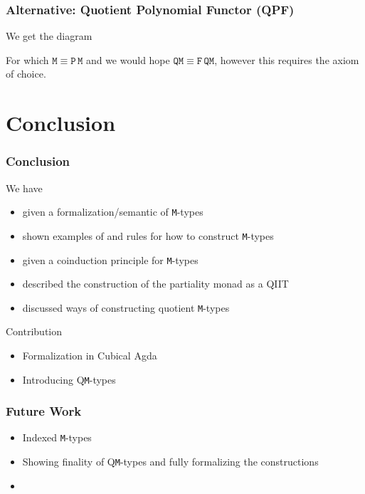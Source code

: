 \documentclass[xelatex,mathserif,serif,notheorems]{beamer} %
\theoremstyle{plain} %
\theoremstyle{definition}
\theoremstyle{remark}
\newcommand*{\type}[1]{\textcolor{magenta!90!black}{#1}}
\newcommand*{\unit}{\type{\textbf{1}}}
\newcommand*{\function}[1]{\textcolor{blue!60!black}{\ensuremath{\mathtt{#1}}}}
\newcommand*{\typeformer}[1]{\ensuremath{\mathtt{#1}}}
\newcommand*{\functor}[1]{\ensuremath{\mathbf{\mathtt{#1}}}}
\begin{document}
\begin{frame}[fragile]
  \frametitle{Alternative: Quotient Polynomial Functor (QPF)}
  We get the diagram
  \begin{figure}
    \centering
  \end{figure}
  For which \(\typeformer{M} \equiv \functor{P}\,\typeformer{M}\) and we would hope \(\typeformer{QM} \equiv \functor{F}\,\typeformer{QM}\), however this requires the axiom of choice.
\end{frame}

\section{Conclusion}
\begin{frame}
  \frametitle{Conclusion}
  We have
  \begin{itemize}
  \item given a formalization/semantic of \texttt{M}-types %
  \item shown examples of and rules for how to construct \texttt{M}-types
  \item given a coinduction principle for \texttt{M}-types
  \item described the construction of the partiality monad as a QIIT
  \item discussed ways of constructing quotient \texttt{M}-types
  \end{itemize}
  Contribution
  \begin{itemize}
  \item Formalization in Cubical Agda
  \item Introducing Q\texttt{M}-types
  \end{itemize}
\end{frame}

\begin{frame}
  \frametitle{Future Work}
  \begin{itemize}
  \item Indexed \texttt{M}-types
  \item Showing finality of Q\texttt{M}-types and fully formalizing the constructions %
  \item 
  \end{itemize}
\end{frame}
\end{document}
